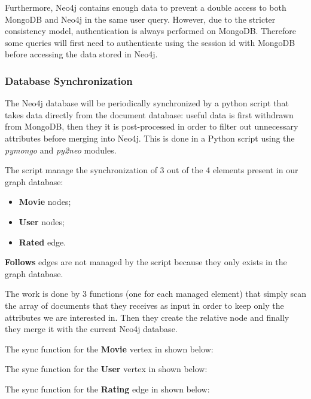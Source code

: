 \documentclass[11pt]{article}
\begin{document}
Furthermore, Neo4j contains enough data to prevent a double access to both 
MongoDB and Neo4j in the same user query. However, due to the stricter 
consistency model, authentication is always performed on MongoDB. Therefore some
queries will first need to authenticate using the session id with MongoDB 
before accessing the data stored in Neo4j.

\subsubsection{Database Synchronization}

The Neo4j database will be periodically synchronized by a python script that takes data directly from the document database: useful data is first withdrawn from MongoDB, then they it is post-processed in order to filter out unnecessary attributes before merging into Neo4j. This is done in a Python script using the \textit{pymongo} and \textit{py2neo} modules.

The script manage the synchronization of 3 out of the 4 elements present in our graph database:

\begin{itemize}
	\item \textbf{Movie} nodes;
	\item \textbf{User} nodes;
	\item \textbf{Rated} edge.
\end{itemize}

\textbf{Follows} edges are not managed by the script because they only exists in the graph database.

The work is done by 3 functions (one for each managed element) that simply scan the array of documents that they receives as input in order to keep only the attributes we are interested in. Then they create the relative node and finally they merge it with the current Neo4j database. 

The sync function for the \textbf{Movie} vertex in shown below:


The sync function for the \textbf{User} vertex in shown below:


The sync function for the \textbf{Rating} edge in shown below:

\end{document}
